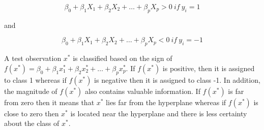 \begin{equation}
\beta_{0} + \beta_{1}X_{1} + \beta_{2}X_{2} + \dotsc + \beta_{p}X_{p} > 0 \ if \ y_{i} = 1
\end{equation}

\begin{center}and\end{center}

\begin{equation}
\beta_{0} + \beta_{1}X_{1} + \beta_{2}X_{2} + \dotsc + \beta_{p}X_{p} < 0 \ if \ y_{i} = -1
\end{equation}

A test observation $x^{*}$ is classified based on the sign of
$f(x^{*})=\beta_{0}+\beta_{1}x^{*}_{1} + \beta_{2}x^{*}_{2} + \dotsc + \beta_{p}x^{*}_{p}$.
If $f(x^{*})$ is positive, then it is assigned to class 1 whereas if $f(x^{*})$ is negative
then it is assigned to class -1. In addition, the magnitude of $f(x^{*})$ also contains valuable
information.
If $f(x^{*})$ is far from zero then it means that $x^{*}$ lies far from the hyperplane
whereas if $f(x^{*})$ is close to zero then $x^{*}$ is located near the hyperplane and
there is less certainty about the class of $x^{*}$.






